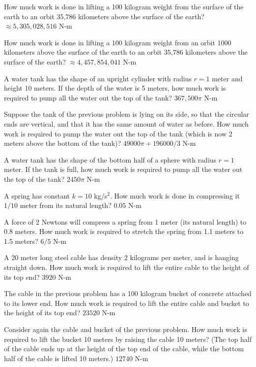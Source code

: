\exercises

\exercise How much work is done in lifting a 100 kilogram weight from
the surface of the earth to an orbit 35,786 kilometers above the
surface of the earth?
\answer $\approx 5,305,028,516$ N-m
\endanswer
\endexercise

\exercise How much work is done in lifting a 100 kilogram weight from
an orbit 1000 kilometers above the surface of the earth to an orbit
35,786 kilometers above the surface of the earth?
\answer $\approx 4,457,854,041$ N-m
\endanswer
\endexercise

\exercise A water tank has the shape of an upright cylinder with radius $r=1$
meter and height 10 meters. If the depth of the water is 5 meters, how
much work is required to pump all the water out the top of the tank?
\answer $367,500 \pi$ N-m
\endanswer
\endexercise

\exercise Suppose the tank of the previous problem is lying on its
side, so that the circular ends are vertical, and that it has the same
amount of water as before. How much work is required to pump the water
out the top of the tank (which is now 2 meters above the bottom of the
tank)?
\answer $49000\pi + 196000/3$ N-m
\endanswer
\endexercise

\exercise A water tank has the shape of the bottom half of a sphere
with radius $r=1$ meter. If the tank is full,
how much work is required to pump all the water out
the top of the tank?
\answer $2450\pi$ N-m
\endanswer
\endexercise

\exercise A spring has constant $k=10$ kg/s$^2$. How much work is done
in compressing it $1/10$ meter from its natural length?
\answer $0.05$ N-m
\endanswer
\endexercise

\exercise A force of 2 Newtons will compress a spring from 1 meter
(its natural length) to
0.8 meters. How much work is required to stretch the spring from 
1.1 meters to 1.5 meters?
\answer $6/5$ N-m
\endanswer
\endexercise

\exercise A 20 meter long steel cable has density 2 kilograms per
meter, and is hanging straight down. How much work is required to lift
the entire cable to the height of its top end?
\answer $3920$ N-m
\endanswer
\endexercise

\exercise The cable in the previous problem has a 100 kilogram bucket
of concrete attached to its lower end. How much work is required to lift
the entire cable and bucket to the height of its top end?
\answer $23520$ N-m
\endanswer
\endexercise

\exercise Consider again the cable and bucket of the previous problem.
How much work is required to lift the bucket 10 meters by raising the
cable 10 meters? (The top half of the cable ends up at the height of
the top end of the cable, while the bottom half of the cable is lifted
10 meters.)
\answer $12740$ N-m
\endanswer
\endexercise

\endexercises

